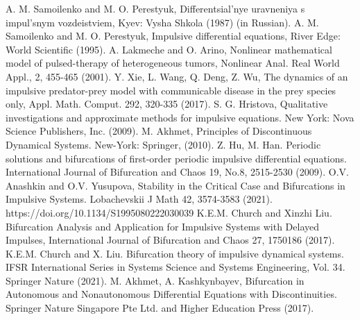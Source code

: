 \begin{thebibliography}{99}
A. M. Samoilenko and M. O. Perestyuk,
Differentsial'nye uravneniya s impul'snym vozdeistviem, Kyev: Vysha Shkola (1987) (in Russian).
A. M. Samoilenko and M. O. Perestyuk,
Impulsive differential equations, River Edge: World Scientific (1995).
A. Lakmeche and O. Arino, Nonlinear mathematical model of pulsed-therapy of heterogeneous
tumors, Nonlinear Anal. Real World Appl., {2}, 455-465 (2001).
Y. Xie, L. Wang, Q. Deng, Z. Wu,  The dynamics of an impulsive predator-prey model with communicable disease in the prey species only, Appl. Math. Comput. 292, 320-335 (2017).
S. G. Hristova, 
Qualitative investigations and approximate methods for impulsive equations. New York: Nova Science Publishers, Inc. (2009).
M. Akhmet, Principles of Discontinuous Dynamical Systems. New-York: Springer, (2010).
Z. Hu, M. Han.
Periodic solutions and bifurcations of first-order periodic impulsive differential equations.
International Journal of Bifurcation and Chaos 19, No.8, 2515-2530 (2009).
O.V. Anashkin and O.V. Yusupova, Stability in the Critical Case and Bifurcations in Impulsive Systems. Lobachevskii J Math 42, 3574-3583 (2021). https://doi.org/10.1134/S1995080222030039
K.E.M. Church and Xinzhi Liu.
Bifurcation Analysis and Application for Impulsive Systems with Delayed Impulses, International Journal of Bifurcation and Chaos {27},  1750186 (2017).
K.E.M. Church and X. Liu. Bifurcation theory of impulsive dynamical systems. IFSR
International Series in Systems Science and Systems Engineering, Vol. 34. Springer
Nature (2021).
M. Akhmet, A. Kashkynbayev,
Bifurcation in Autonomous and Nonautonomous
Differential Equations with Discontinuities.
Springer Nature Singapore Pte Ltd. and Higher Education Press (2017).

\end{thebibliography}

